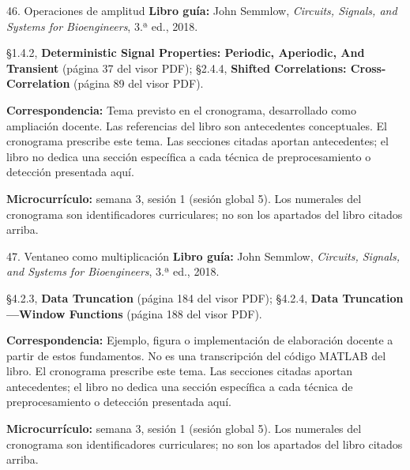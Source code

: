 \documentclass[
  10pt,
  ignorenonframetext,
  aspectratio=169,
  spanish,
]{beamer}
\begin{document}
\begin{frame}{46. Operaciones de amplitud}
\label{operaciones-de-amplitud}
\textbf{Libro guía:} John Semmlow, \emph{Circuits, Signals, and Systems
for Bioengineers}, 3.ª ed., 2018.

§1.4.2, \textbf{Deterministic Signal Properties: Periodic, Aperiodic,
And Transient} (página 37 del visor PDF); §2.4.4, \textbf{Shifted
Correlations: Cross-Correlation} (página 89 del visor PDF).

\textbf{Correspondencia:} Tema previsto en el cronograma, desarrollado
como ampliación docente. Las referencias del libro son antecedentes
conceptuales. El cronograma prescribe este tema. Las secciones citadas
aportan antecedentes; el libro no dedica una sección específica a cada
técnica de preprocesamiento o detección presentada aquí.

\textbf{Microcurrículo:} semana 3, sesión 1 (sesión global 5). Los
numerales del cronograma son identificadores curriculares; no son los
apartados del libro citados arriba.
\end{frame}

\begin{frame}{47. Ventaneo como multiplicación}
\label{ventaneo-como-multiplicaciuxf3n}
\textbf{Libro guía:} John Semmlow, \emph{Circuits, Signals, and Systems
for Bioengineers}, 3.ª ed., 2018.

§4.2.3, \textbf{Data Truncation} (página 184 del visor PDF); §4.2.4,
\textbf{Data Truncation---Window Functions} (página 188 del visor PDF).

\textbf{Correspondencia:} Ejemplo, figura o implementación de
elaboración docente a partir de estos fundamentos. No es una
transcripción del código MATLAB del libro. El cronograma prescribe este
tema. Las secciones citadas aportan antecedentes; el libro no dedica una
sección específica a cada técnica de preprocesamiento o detección
presentada aquí.

\textbf{Microcurrículo:} semana 3, sesión 1 (sesión global 5). Los
numerales del cronograma son identificadores curriculares; no son los
apartados del libro citados arriba.
\end{frame}
\end{document}
